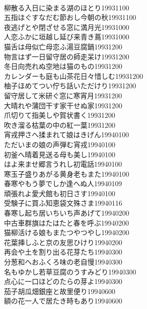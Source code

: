 \begin{multicols}{2}
\\柳散る入日に染まる湖のほとり\hfill{19931100}
\\五指ほぐすなだむ節おし今朝の秋\hfill{19931100}
\\夜逃げとや閉ざせる窓に満月光\hfill{19931000}
\\人恋ふかに垣越し延び来青き蔦\hfill{19931000}
\\猫舌は母似亡母恋ふ湯豆腐鍋\hfill{19931200}
\\物言はず一日留守居の師走呆け\hfill{19931200}
\\冬日向売れぬ空地は猫のもの\hfill{19931200}
\\カレンダーも庭も山茶花日々惜しむ\hfill{19931200}
\\柚子ほめてつい佇ち話いただけり\hfill{19931200}
\\留守居して米研ぐ窓に寒宵月\hfill{19931200}
\\大晴れや蒲団干す家干せぬ家\hfill{19931200}
\\爪切りて指美しや賀状書く\hfill{19931200}
\\吹き溜る枯葉の中の紅一葉\hfill{19931200}
\\宵戎押さへ揉まれて娘はきげん\hfill{19940100}
\\ただいまの娘の声弾む宵戎\hfill{19940100}
\\初釜へ晴着見送る母も美し\hfill{19940100}
\\はよ来ませ郷言うれし初電話\hfill{19940100}
\\寒玉子盛りあがる黄身老もまた\hfill{19940100}
\\春寒やもう夢でしか逢へぬ人\hfill{19940109}
\\頑張れよ愛犬館も初日さす\hfill{19940100}
\\受験子に買ふ知恵袋文殊さま\hfill{19940116}
\\春寒し起ち居いちいち声あげて\hfill{19940200}
\\中古車群旗はたはたと春を呼ぶ\hfill{19940200}
\\猫柳活ける娘もまたつやつやし\hfill{19940200}
\\花葉挿しふと京の友思ひけり\hfill{19940200}
\\再会や土を割り出る花芽たち\hfill{19940300}
\\分葱和へおふくろ味の老自慢\hfill{19940300}
\\名もゆかし若草豆腐のうすみどり\hfill{19940300}
\\点心に一口ほどのたらの芽よ\hfill{19940300}
\\茄子胡瓜畑銀座と故里便り\hfill{19940600}
\\額の花一人で居たき時もあり\hfill{19940600}

\end{multicols}
